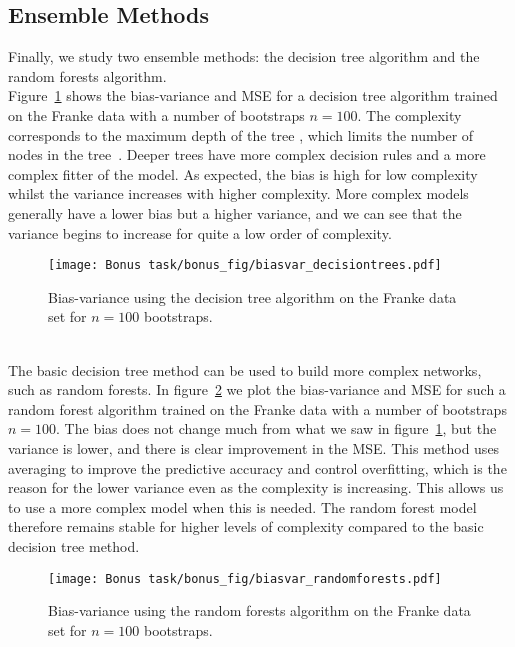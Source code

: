\documentclass[reprint,english,notitlepage]{revtex4-1}  %
\begin{document}
\subsection*{Ensemble Methods}
Finally, we study two ensemble methods: the decision tree algorithm and the random forests algorithm. 
\vspace{3mm}
\\
Figure~\ref{fig: decisiontree} shows the bias-variance and MSE for a decision tree algorithm trained on the Franke data with a number of bootstraps $n=100$. The complexity corresponds to the maximum depth of the tree
, which limits the number of nodes in the tree~\cite{scikit}. Deeper trees have more complex decision rules and a more complex fitter of the model. As expected, the bias is high for low complexity whilst the variance increases with higher complexity. More complex models generally have a lower bias but a higher variance, and we can see that the variance begins to increase for quite a low order of complexity. 
\begin{figure}[h!]
    \centering %
    \texttt{[image: Bonus task/bonus\_fig/biasvar\_decisiontrees.pdf]} 
    \caption{Bias-variance using the decision tree algorithm on the Franke data set for $n=100$ bootstraps.}
    \label{fig: decisiontree}
\end{figure}
\vspace{3mm}
\\
The basic decision tree method can be used to build more complex networks, such as random forests. In figure~\ref{fig: random} we plot the bias-variance and MSE for such a random forest algorithm trained on the Franke data with a number of bootstraps $n=100$. The bias does not change much from what we saw in figure~\ref{fig: decisiontree}, but the variance is lower, and there is clear improvement in the MSE. This method uses averaging to improve the predictive accuracy and control overfitting, which is the reason for the lower variance even as the complexity is increasing. This allows us to use a more complex model when this is needed. The random forest model therefore remains stable for higher levels of complexity compared to the basic decision tree method. 
\begin{figure}[h!]
    \centering %
    \texttt{[image: Bonus task/bonus\_fig/biasvar\_randomforests.pdf]} 
    \caption{Bias-variance using the random forests algorithm on the Franke data set for $n=100$ bootstraps.}
    \label{fig: random}
\end{figure}
\end{document}
